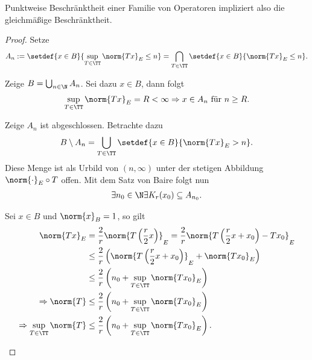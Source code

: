 Punktweise Beschränktheit einer Familie von Operatoren impliziert also die
gleichmäßige Beschränktheit.

\begin{proof}
Setze
\begin{align*}
A_n := \setdef{x\in B}{\sup\limits_{T\in\TT} \norm{Tx}_E \le n}
= \bigcap_{T\in\TT}\setdef{x\in B}{\norm{Tx}_E\le n}.
\end{align*}
\begin{proofenum}
  \item Zeige $B=\bigcup_{n\in\N} A_n$. Sei dazu $x\in B$, dann folgt
\begin{align*}
\sup\limits_{T\in\TT}\norm{Tx}_E = R<\infty
\Rightarrow x\in A_n \text{ für }n\ge R.
\end{align*}
\item Zeige $A_n$ ist abgeschlossen. Betrachte dazu
\begin{align*}
B\setminus A_n = \bigcup_{T\in\TT} \setdef{x\in B}{\norm{Tx}_E > n}.
\end{align*}
Diese Menge ist als Urbild von $(n,\infty)$ unter der stetigen
Abbildung $\norm{\cdot}_E\circ T$ offen.  Mit dem Satz von Baire folgt nun
\begin{align*}
\exists n_0\in\N \exists K_r(x_0)\subseteq A_{n_0}.
\end{align*}
\item Sei $x\in B$ und $\norm{x}_B=1$, so gilt
\begin{align*}
\norm{Tx}_E &= \frac{2}{r}\norm{T\left(\frac{r}{2}x\right)}_E =
\frac{2}{r}\norm{T\left(\frac{r}{2}x+x_0\right)-Tx_0}_E\\
&\le
\frac{2}{r}\left(\norm{T\left(\frac{r}{2}x+x_0\right)}_E+\norm{Tx_0}_E\right)\\
&\le \frac{2}{r}\left(n_0 + \sup\limits_{T\in\TT} \norm{Tx_0}_E\right)\\
\Rightarrow \norm{T} &\le \frac{2}{r}\left(n_0 + \sup\limits_{T\in\TT}
\norm{Tx_0}_E\right)\\
 \Rightarrow \sup\limits_{T\in\TT}\norm{T} &\le \frac{2}{r}\left(n_0 +
\sup\limits_{T\in\TT} \norm{Tx_0}_E\right).\qedhere
\end{align*}
\end{proofenum}
\end{proof}

